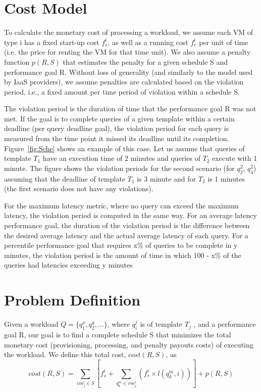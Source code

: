 \section{Cost Model}
To calculate the monetary cost of processing a workload, we assume each VM of type i has a fixed start-up cost \(f^i_s\), as well as a running cost \(f^i_r\) per unit of time (i.e. the price for renting the VM for that time unit). We also assume a penalty function \(p(R,S)\) that estimates the penalty for a given schedule S and performance goal R. Without loss of generality (and similarly to the model used by IaaS providers), we assume penalties are calculated based on the violation period, i.e., a fixed amount per time period of violation within a schedule S. 

The violation period is the duration of time that the performance goal R was not met. If the goal is to complete queries of a given template within a certain deadline (per query deadline goal), the violation period for each query is measured from the time point it missed its deadline until its completion. Figure~\ref{fig:Sche} shows an example of this case. Let us assume that queries of template \(T_1\) have an execution time of 2 minutes and queries of \(T_2\) execute with 1 minute. The figure shows the violation periods for the second scenario (for \(q^2_2\), \(q^2_4\)) assuming that the deadline of template \(T_1\) is 3 minute and for \(T_2\) is 1 minutes (the first scenario does not have any violations). 

For the maximum latency metric, where no query can exceed the maximum latency, the violation period is computed in the same way. For an average latency performance goal, the duration of the violation period is the difference between the desired average latency and the actual average latency of each query. For a percentile performance goal that requires x\% of queries to be complete in y minutes, the violation period is the amount of time in which 100 - x\% of the queries had latencies exceeding y minutes

\section{Problem Definition}
Given a workload \(Q = \{q_1^x , q_2^y , . . . \}\), where \(q^j_i\) is of template \(T_j\) , and a performance goal R, our goal is to find a complete schedule S that minimizes the total monetary cost (provisioning, processing, and penalty payouts costs) of executing the workload. We define this total cost, \(cost(R, S)\), as 
\begin{equation} \label{eq:1}
cost(R,S) =  \sum_{vm^i_j \in S} [f^i_s + \sum_{q^m_k \in vm^i_j} (f^i_r \times l(q^m_k,i))] + p(R,S)
\end{equation}

